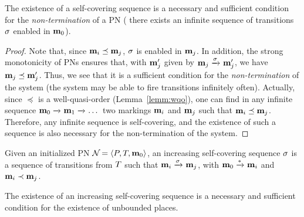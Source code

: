 \begin{lemm}
	\label{theo:self-cov-non-termination}
	The existence of a self-covering sequence is a necessary and sufficient condition for the \emph{non-termination} of a PN ( there exists an infinite sequence of transitions $\seqt$ enabled in $\mathbf{m}_0$).
\end{lemm}

\begin{proof}
Note that, since $\mathbf{m}_i \preceq \mathbf{m}_j$, $\seqt$ is enabled in $\mathbf{m}_j$.
In addition, the strong monotonicity of \acp{PN} ensures that, with $\mathbf{m}'_j$ given by $\mar_j \fire{\seqt} \mar'_j$, we have $\mathbf{m}_j \preceq \mathbf{m}'_j$.
Thus, we see that it is a sufficient condition for the \emph{non-termination} of the system (the system may be able to fire transitions infinitely often).
Actually, since $\preceq$ is a well-quasi-order (Lemma~\ref{lemm:wqo}), one can find in any infinite sequence $\mathbf{m}_0 \xrightarrow{}_{} \mathbf{m}_1 \xrightarrow{}_{} \dots$ two markings $\mathbf{m}_i$ and $\mathbf{m}_j$ such that $\mathbf{m}_i \preceq \mathbf{m}_j$.
Therefore, any infinite sequence is self-covering, and the existence of such a sequence is also necessary for the non-termination of the system.
\end{proof}

\begin{defi}
  Given an initialized \ac{PN} $\defPN$,
  an increasing self-covering sequence $\seqt$ is a sequence of transitions from $T$ such that
  \(
    \mar_i \fire{\seqt} \mar_j
  \),
  with $\mathbf{m}_0 \xrightarrow{*}_{} \mathbf{m}_i$
  and $\mathbf{m}_i \prec \mathbf{m}_j$.
\end{defi}

\begin{lemm}
	\label{theo:self-cov-non-termination}
	The existence of an increasing self-covering sequence is a necessary and sufficient condition for the existence of unbounded places.
\end{lemm}

